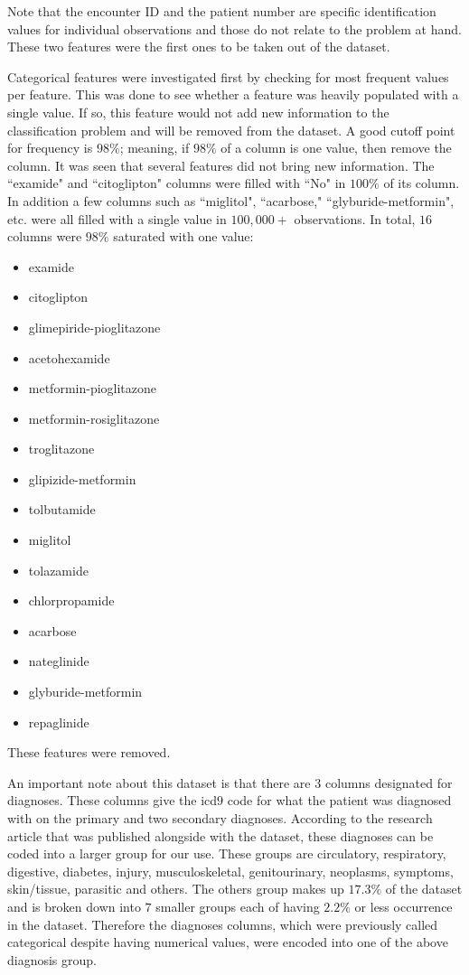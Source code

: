 \documentclass{article}
\begin{document}
Note that the encounter ID and the patient number are specific identification values for individual observations and those do not relate to the problem at hand. These two features were the first ones to be taken out of the dataset. 

Categorical features were investigated first by checking for most frequent values per feature. This was done to see whether a feature was heavily populated with a single value. If so, this feature would not add new information to the classification problem and will be removed from the dataset. A good cutoff point for frequency is $98\%$; meaning, if $98\%$ of a column is one value, then remove the column. It was seen that several features did not bring new information. The ``examide" and ``citoglipton" columns were filled with ``No" in $100\%$ of its column. In addition a few columns such as ``miglitol", ``acarbose," ``glyburide-metformin", etc. were all filled with a single value in $100,000+$ observations. In total, $16$ columns were $98\%$ saturated with one value: 
\begin{multicols}{3} 
\begin{itemize} 
\item examide \item citoglipton \item glimepiride-pioglitazone \item acetohexamide \item metformin-pioglitazone \item metformin-rosiglitazone \item troglitazone \item glipizide-metformin \item tolbutamide \item miglitol \item tolazamide \item chlorpropamide \item acarbose \item nateglinide \item glyburide-metformin \item repaglinide \end{itemize} \end{multicols} 
These features were removed. 

An important note about this dataset is that there are $3$ columns designated for diagnoses. These columns give the icd$9$ code for what the patient was diagnosed with on the primary and two secondary diagnoses. According to the research article that was published alongside with the dataset, these diagnoses can be coded into a larger group for our use. These groups are circulatory, respiratory, digestive, diabetes, injury, musculoskeletal, genitourinary, neoplasms, symptoms, skin/tissue, parasitic and others. The others group makes up $17.3\%$ of the dataset and is broken down into $7$ smaller groups each of having $2.2\%$ or less occurrence in the dataset. Therefore the diagnoses columns, which were previously called categorical despite having numerical values, were encoded into one of the above diagnosis group. 
\end{document}
